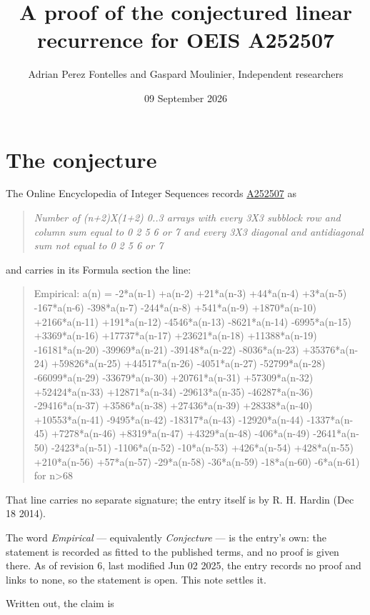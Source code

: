 \documentclass[11pt]{article}
\title{A proof of the conjectured linear recurrence for OEIS A252507}
\author{Adrian Perez Fontelles and Gaspard Moulinier, Independent researchers}
\date{09 September 2026}
\theoremstyle{definition}
\begin{document}
\maketitle
\section{The conjecture}

The Online Encyclopedia of Integer Sequences records \href{https://oeis.org/A252507}{A252507} as

\begin{quote}\itshape Number of (n+2)X(1+2) 0..3 arrays with every 3X3 subblock row and column sum equal to 0 2 5 6 or 7 and every 3X3 diagonal and antidiagonal sum not equal to 0 2 5 6 or 7\end{quote}

and carries in its Formula section the line:

\begin{quote}\ttfamily Empirical: a(n) = -2*a(n-1) +a(n-2) +21*a(n-3) +44*a(n-4) +3*a(n-5) -167*a(n-6) -398*a(n-7) -244*a(n-8) +541*a(n-9) +1870*a(n-10) +2166*a(n-11) +191*a(n-12) -4546*a(n-13) -8621*a(n-14) -6995*a(n-15) +3369*a(n-16) +17737*a(n-17) +23621*a(n-18) +11388*a(n-19) -16181*a(n-20) -39969*a(n-21) -39148*a(n-22) -8036*a(n-23) +35376*a(n-24) +59826*a(n-25) +44517*a(n-26) -4051*a(n-27) -52799*a(n-28) -66099*a(n-29) -33679*a(n-30) +20761*a(n-31) +57309*a(n-32) +52424*a(n-33) +12871*a(n-34) -29613*a(n-35) -46287*a(n-36) -29416*a(n-37) +3586*a(n-38) +27436*a(n-39) +28338*a(n-40) +10553*a(n-41) -9495*a(n-42) -18317*a(n-43) -12920*a(n-44) -1337*a(n-45) +7278*a(n-46) +8319*a(n-47) +4329*a(n-48) -406*a(n-49) -2641*a(n-50) -2423*a(n-51) -1106*a(n-52) -10*a(n-53) +426*a(n-54) +428*a(n-55) +210*a(n-56) +57*a(n-57) -29*a(n-58) -36*a(n-59) -18*a(n-60) -6*a(n-61) for n>68\end{quote}

That line carries no separate signature; the entry itself is by R. H. Hardin (Dec 18 2014).

The word {\itshape Empirical} --- equivalently {\itshape Conjecture} --- is the entry's own: the statement is recorded as fitted to the published terms, and no proof is given there. As of revision 6, last modified Jun 02 2025, the entry records no proof and links to none, so the statement is open. This note settles it.

Written out, the claim is
\end{document}
